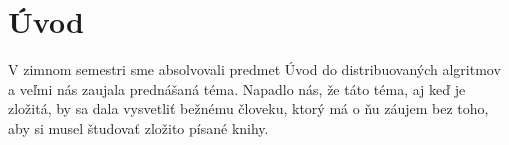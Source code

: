 \section{Úvod}

V zimnom semestri sme absolvovali predmet Úvod do distribuovaných algritmov a veľmi nás zaujala
prednášaná téma. Napadlo nás, že táto téma, aj keď je zložitá, by sa dala vysvetliť bežnému človeku,
ktorý má o ňu záujem bez toho, aby si musel študovať zložito písané knihy.

